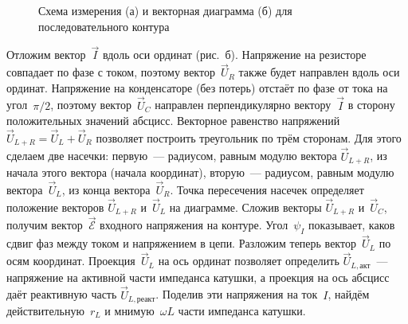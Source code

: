 \begin{figure}[h]
	\begin{minipage}[h]{0.49\linewidth}
		\centering
	\end{minipage}
	\hfill
	\begin{minipage}[h]{0.49\linewidth}
		\centering
	\end{minipage}
	\caption{Схема измерения (а) и векторная  диаграмма (б) для
последовательного контура}
\end{figure}

Отложим вектор~$\vec I$ вдоль оси ординат (рис.~б). Напряжение на
резисторе совпадает по фазе с током, поэтому вектор~$\vec U_R$ также будет
направлен вдоль оси ординат. Напряжение на конденсаторе (без потерь) отстаёт по
фазе от тока на угол~$\pi/2$, поэтому вектор~$\vec U_C$ направлен
перпендикулярно вектору~$\vec I$ в сторону положительных значений абсцисс.
Векторное равенство напряжений $\vec U_{L+R}=\vec U_L+\vec U_R$ позволяет
построить треугольник по трём сторонам. Для этого сделаем две насечки:
первую~--- радиусом, равным модулю вектора $\vec U_{L+R}$, из начала этого
вектора (начала координат), вторую~--- радиусом, равным модулю вектора~$\vec
U_L$, из конца вектора~$\vec U_R$. Точка пересечения насечек определяет
положение векторов $\vec U_{L+R}$ и~$\vec U_L$ на диаграмме. Сложив векторы
$\vec{U}_{L+R}$ и~$\vec U_C$, получим вектор~$\vec{\mathcal{E}}$ входного
напряжения на контуре. Угол~$\psi_I$ показывает, каков сдвиг фаз между током и
напряжением в цепи. Разложим теперь вектор~$\vec U_L$ по осям координат.
Проекция~$\vec U_L$ на ось ординат позволяет определить $\vec
U_{L,\text{акт}}$~--- напряжение на активной части импеданса катушки, а проекция
на ось абсцисс даёт реактивную часть $\vec U_{L,\text{реакт}}$. Поделив эти
напряжения на ток~$I$, найдём действительную~$r_L$ и мнимую~$\omega L$ части
импеданса катушки.

